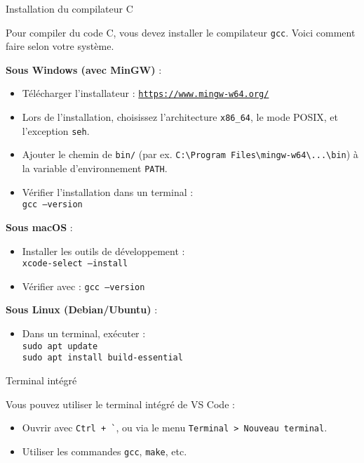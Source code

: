 \documentclass[TP, noCustomPackages]{UPSTI_Document}
\begin{document}
\begin{UPSTIinfor}{Installation du compilateur C}

Pour compiler du code C, vous devez installer le compilateur \texttt{gcc}. Voici comment faire selon votre système.

\textbf{Sous Windows (avec MinGW)} :
\begin{itemize}
    \item Télécharger l’installateur : \href{https://www.mingw-w64.org/}{\texttt{https://www.mingw-w64.org/}}
    \item Lors de l’installation, choisissez l’architecture \texttt{x86\_64}, le mode POSIX, et l’exception \texttt{seh}.
    \item Ajouter le chemin de \texttt{bin/} (par ex. \texttt{C:\textbackslash Program Files\textbackslash mingw-w64\textbackslash ...\textbackslash bin}) à la variable d’environnement \texttt{PATH}.
    \item Vérifier l’installation dans un terminal :\\
    \texttt{gcc --version}
\end{itemize}

\textbf{Sous macOS} :
\begin{itemize}
    \item Installer les outils de développement :\\
    \texttt{xcode-select --install}
    \item Vérifier avec : \texttt{gcc --version}
\end{itemize}

\textbf{Sous Linux (Debian/Ubuntu)} :
\begin{itemize}
    \item Dans un terminal, exécuter :\\
    \texttt{sudo apt update} \\
    \texttt{sudo apt install build-essential}
\end{itemize}

\end{UPSTIinfor}

\begin{UPSTIinfor}{Terminal intégré}

Vous pouvez utiliser le terminal intégré de VS Code :
\begin{itemize}
    \item Ouvrir avec \texttt{Ctrl + \`}, ou via le menu \texttt{Terminal > Nouveau terminal}.
    \item Utiliser les commandes \texttt{gcc}, \texttt{make}, etc.
\end{itemize}

\end{UPSTIinfor}
\end{document}
